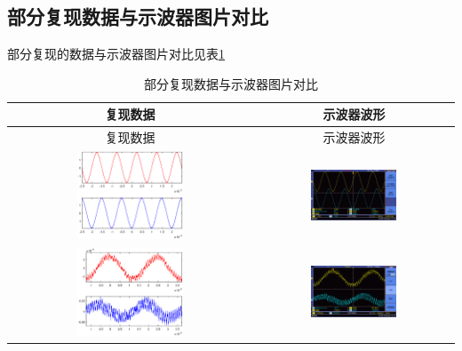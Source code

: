 \documentclass[12pt]{article}
\begin{document}
\subsection{部分复现数据与示波器图片对比}
部分复现的数据与示波器图片对比见表\ref{FXSJDB}
\begin{longtable}{|c|c|}
    \caption{部分复现数据与示波器图片对比}
    \label{FXSJDB}\\
    \hline
   复现数据&示波器波形\\
    \hline
    \endfirsthead

    \hline
    复现数据&示波器波形\\
    \hline
    \endhead

    \hline
    \endfoot

\hline
    \endlastfoot

\includegraphics[width=0.45\textwidth]{rebuild/001}&\includegraphics[width=0.45\textwidth]{data3/new/F0007TEK}\\ \hline
\includegraphics[width=0.45\textwidth]{rebuild/002}&\includegraphics[width=0.45\textwidth]{data3/new2/F0011TEK}\\ \hline

\end{longtable}
\end{document}
